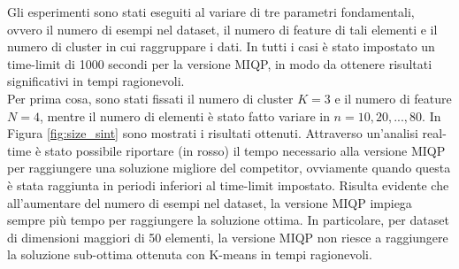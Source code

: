 \documentclass{article}
\begin{document}
    Gli esperimenti sono stati eseguiti al variare di tre parametri fondamentali, ovvero il numero di esempi nel dataset, il numero di feature di tali elementi e il numero di cluster in cui raggruppare i dati. In tutti i casi è stato impostato un time-limit di 1000 secondi per la versione MIQP, in modo da ottenere risultati significativi in tempi ragionevoli.\\
    Per prima cosa, sono stati fissati il numero di cluster $K=3$ e il numero di feature $N=4$, mentre il numero di elementi è stato fatto variare in $n=10,20,...,80$. In Figura \ref{fig:size_sint} sono mostrati i risultati ottenuti. Attraverso un'analisi real-time è stato possibile riportare (in rosso) il tempo necessario alla versione MIQP per raggiungere una soluzione migliore del competitor, ovviamente quando questa è stata raggiunta in periodi inferiori al time-limit impostato.
    Risulta evidente che all'aumentare del numero di esempi nel dataset, la versione MIQP impiega sempre più tempo per raggiungere la soluzione ottima. In particolare, per dataset di dimensioni maggiori di 50 elementi, la versione MIQP non riesce a raggiungere la soluzione sub-ottima ottenuta con K-means in tempi ragionevoli.\\
\end{document}
